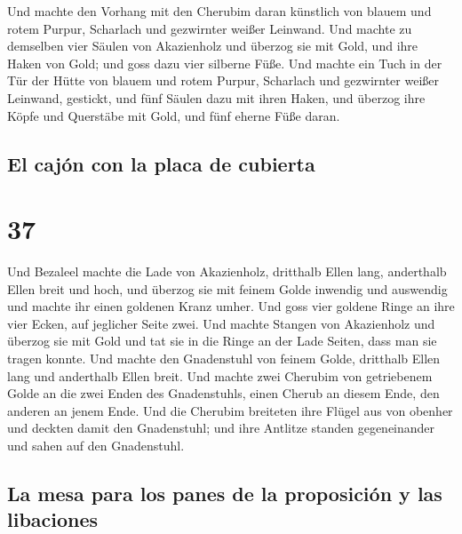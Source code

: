  Und machte den Vorhang mit den Cherubim daran künstlich
von blauem und rotem Purpur, Scharlach und gezwirnter weißer Leinwand.
 Und machte zu demselben vier Säulen von Akazienholz und
überzog sie mit Gold, und ihre Haken von Gold; und goss dazu vier
silberne Füße.  Und machte ein Tuch in der Tür der Hütte
von blauem und rotem Purpur, Scharlach und gezwirnter weißer Leinwand,
gestickt,  und fünf Säulen dazu mit ihren Haken, und
überzog ihre Köpfe und Querstäbe mit Gold, und fünf eherne Füße daran.

\hypertarget{el-cajuxf3n-con-la-placa-de-cubierta}{%
\subsection{El cajón con la placa de
cubierta}\label{el-cajuxf3n-con-la-placa-de-cubierta}}

\hypertarget{section-36}{%
\section{37}\label{section-36}}

 Und Bezaleel machte die Lade von Akazienholz, dritthalb
Ellen lang, anderthalb Ellen breit und hoch,  und überzog
sie mit feinem Golde inwendig und auswendig und machte ihr einen
goldenen Kranz umher.  Und goss vier goldene Ringe an ihre
vier Ecken, auf jeglicher Seite zwei.  Und machte Stangen
von Akazienholz und überzog sie mit Gold  und tat sie in
die Ringe an der Lade Seiten, dass man sie tragen konnte. 
Und machte den Gnadenstuhl von feinem Golde, dritthalb Ellen lang und
anderthalb Ellen breit.  Und machte zwei Cherubim von
getriebenem Golde an die zwei Enden des Gnadenstuhls, 
einen Cherub an diesem Ende, den anderen an jenem Ende. 
Und die Cherubim breiteten ihre Flügel aus von obenher und deckten damit
den Gnadenstuhl; und ihre Antlitze standen gegeneinander und sahen auf
den Gnadenstuhl.

\hypertarget{la-mesa-para-los-panes-de-la-proposiciuxf3n-y-las-libaciones}{%
\subsection{La mesa para los panes de la proposición y las
libaciones}\label{la-mesa-para-los-panes-de-la-proposiciuxf3n-y-las-libaciones}}

